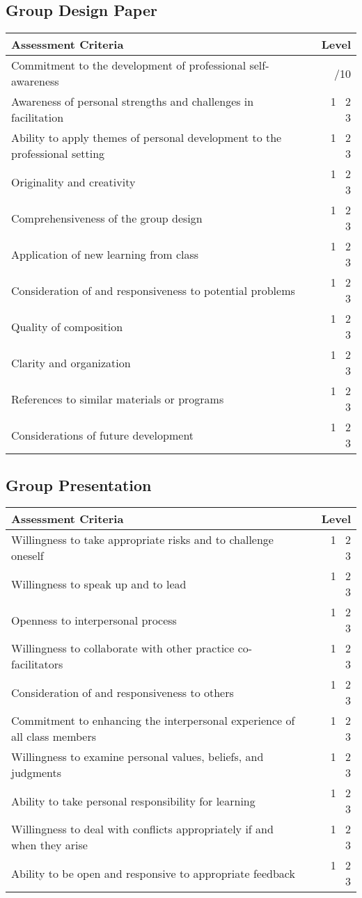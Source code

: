 \documentclass[letterpaper,10pt,headsepline]{scrreprt}
\begin{document}
\subsection{Group Design Paper}
\begin{tabular}{|l|r|}
\hline
Assessment Criteria & Level\\
\hline
Commitment to the development of professional self-awareness & /10 \\
Awareness of personal strengths and challenges in facilitation & \ 1 \ 2 \ 3 \\
Ability to apply themes of personal development to the professional setting & \ 1 \ 2 \ 3 \\
Originality and creativity & \ 1 \ 2 \ 3 \\
Comprehensiveness of the group design & \ 1 \ 2 \ 3 \\
Application of new learning from class & \ 1 \ 2 \ 3 \\
Consideration of and responsiveness to potential problems & \ 1 \ 2 \ 3 \\
Quality of composition & \ 1 \ 2 \ 3 \\
Clarity and organization & \ 1 \ 2 \ 3 \\
References to similar materials or programs & \ 1 \ 2 \ 3 \\
Considerations of future development & \ 1 \ 2 \ 3 \\
\hline
\end{tabular}
\subsection{Group Presentation}
\begin{tabular}{|l|r|}
\hline
Assessment Criteria & Level\\
\hline
Willingness to take appropriate risks and to challenge oneself & \ 1 \ 2 \ 3 \\
Willingness to speak up and to lead & \ 1 \ 2 \ 3 \\
Openness to interpersonal process & \ 1 \ 2 \ 3 \\
Willingness to collaborate with other practice co-facilitators & \ 1 \ 2 \ 3 \\
Consideration of and responsiveness to others & \ 1 \ 2 \ 3 \\
Commitment to enhancing the interpersonal experience of all class members & \ 1 \ 2 \ 3 \\
Willingness to examine personal values, beliefs, and judgments & \ 1 \ 2 \ 3 \\
Ability to take personal responsibility for learning & \ 1 \ 2 \ 3 \\
Willingness to deal with conflicts appropriately if and when they arise & \ 1 \ 2 \ 3 \\
Ability to be open and responsive to appropriate feedback & \ 1 \ 2 \ 3 \\
\hline
\end{tabular}
\end{document}
